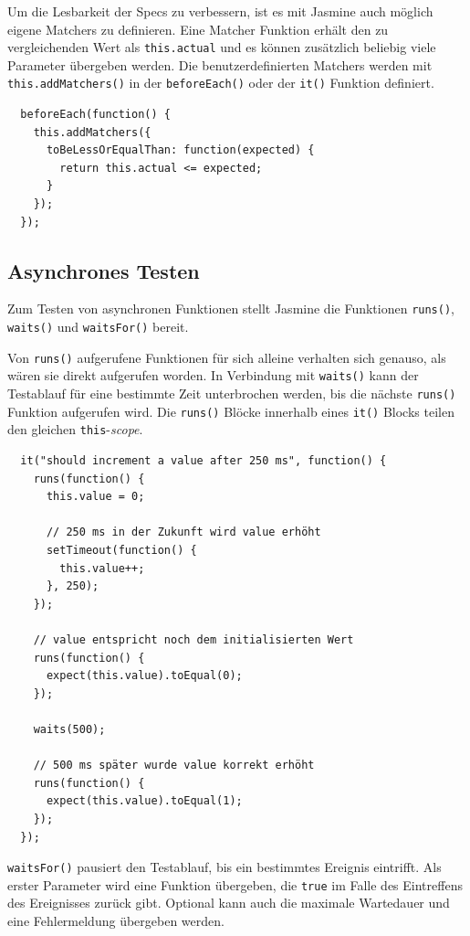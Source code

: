 \documentclass[11pt, a4paper]{article}
\begin{document}
Um die Lesbarkeit der Specs zu verbessern, ist es mit Jasmine auch möglich eigene
Matchers zu definieren. Eine Matcher Funktion erhält den zu vergleichenden Wert
als \texttt{this.actual} und es können zusätzlich beliebig viele Parameter
übergeben werden. Die benutzerdefinierten Matchers werden mit
\texttt{this.addMatchers()} in der \texttt{beforeEach()} oder der \texttt{it()}
Funktion definiert.

\begin{verbatim}
  beforeEach(function() {
    this.addMatchers({
      toBeLessOrEqualThan: function(expected) {
        return this.actual <= expected;
      }
    });
  });
\end{verbatim}

\subsection{Asynchrones Testen}

Zum Testen von asynchronen Funktionen stellt Jasmine die Funktionen
\texttt{runs()}, \texttt{waits()} und \texttt{waitsFor()} bereit.

Von \texttt{runs()} aufgerufene Funktionen für sich alleine verhalten sich
genauso, als wären sie direkt aufgerufen worden. In Verbindung mit
\texttt{waits()} kann der Testablauf für eine bestimmte Zeit unterbrochen
werden, bis die nächste \texttt{runs()} Funktion aufgerufen wird. Die
\texttt{runs()} Blöcke innerhalb eines \texttt{it()} Blocks teilen den gleichen
\texttt{this}-\emph{scope}.

\begin{verbatim}
  it("should increment a value after 250 ms", function() {
    runs(function() {
      this.value = 0;

      // 250 ms in der Zukunft wird value erhöht
      setTimeout(function() {
        this.value++;
      }, 250);
    });

    // value entspricht noch dem initialisierten Wert
    runs(function() {
      expect(this.value).toEqual(0);
    });

    waits(500);

    // 500 ms später wurde value korrekt erhöht
    runs(function() {
      expect(this.value).toEqual(1);
    });
  });
\end{verbatim}

\texttt{waitsFor()} pausiert den Testablauf, bis ein bestimmtes Ereignis
eintrifft. Als erster Parameter wird eine Funktion übergeben, die \texttt{true}
im Falle des Eintreffens des Ereignisses zurück gibt. Optional kann auch die
maximale Wartedauer und eine Fehlermeldung übergeben werden.
\end{document}
